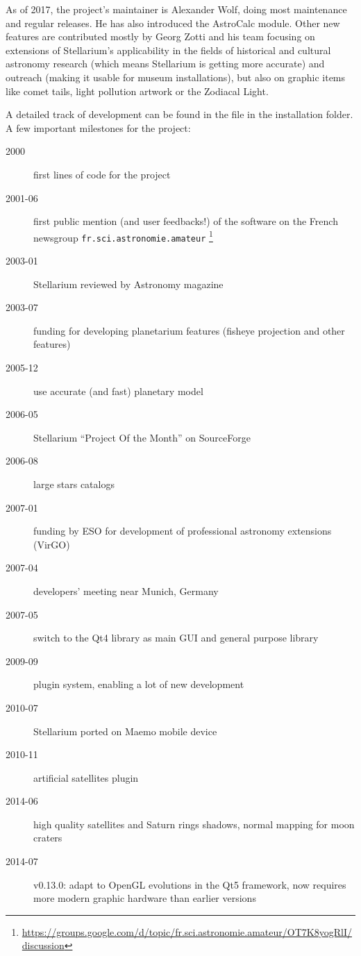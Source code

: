 As of 2017, the project's maintainer is Alexander Wolf, doing most
maintenance and regular releases. He has also introduced the AstroCalc module.
Other new features are contributed
mostly by Georg Zotti and his team focusing on extensions of
Stellarium's applicability in the fields of historical and cultural
astronomy research (which means Stellarium is getting more accurate)
and outreach (making it usable for museum installations), but also on
graphic items like comet tails, light pollution artwork or the Zodiacal Light. 

\vspace{1\baselineskip}
\noindent A detailed track of development can be found in the
 file in the installation folder. A few important
milestones for the project:
\begin{description}
\item[2000] first lines of code for the project
\item[2001-06] first public mention (and user feedbacks!) of the
  software on the French newsgroup \texttt{fr.sci.astronomie.amateur} 
  \footnote{\url{https://groups.google.com/d/topic/fr.sci.astronomie.amateur/OT7K8yogRlI/discussion}}
\item[2003-01] Stellarium reviewed by Astronomy magazine
\item[2003-07] funding for developing planetarium features (fisheye projection and other features)
\item[2005-12] use accurate (and fast) planetary model
\item[2006-05] Stellarium ``Project Of the Month'' on SourceForge
\item[2006-08] large stars catalogs
\item[2007-01] funding by ESO for development of professional astronomy extensions (VirGO)
\item[2007-04] developers' meeting near Munich, Germany
\item[2007-05] switch to the Qt4 library as main GUI and general purpose library
\item[2009-09] plugin system, enabling a lot of new development
\item[2010-07] Stellarium ported on Maemo mobile device
\item[2010-11] artificial satellites plugin
\item[2014-06] high quality satellites and Saturn rings shadows, normal mapping for moon craters
\item[2014-07] v0.13.0: adapt to OpenGL evolutions in the Qt5 framework, now requires more modern graphic hardware than earlier versions

\end{description}
